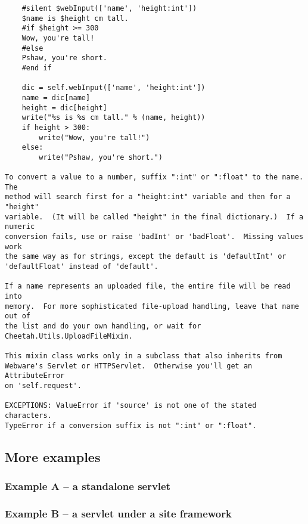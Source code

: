 \begin{verbatim}
    #silent $webInput(['name', 'height:int'])
    $name is $height cm tall.
    #if $height >= 300
    Wow, you're tall!
    #else
    Pshaw, you're short.
    #end if

    dic = self.webInput(['name', 'height:int'])
    name = dic[name]
    height = dic[height]
    write("%s is %s cm tall." % (name, height))
    if height > 300:
        write("Wow, you're tall!")
    else:
        write("Pshaw, you're short.")

To convert a value to a number, suffix ":int" or ":float" to the name.  The
method will search first for a "height:int" variable and then for a "height"
variable.  (It will be called "height" in the final dictionary.)  If a numeric
conversion fails, use or raise 'badInt' or 'badFloat'.  Missing values work
the same way as for strings, except the default is 'defaultInt' or
'defaultFloat' instead of 'default'.

If a name represents an uploaded file, the entire file will be read into 
memory.  For more sophisticated file-upload handling, leave that name out of
the list and do your own handling, or wait for Cheetah.Utils.UploadFileMixin.

This mixin class works only in a subclass that also inherits from 
Webware's Servlet or HTTPServlet.  Otherwise you'll get an AttributeError
on 'self.request'.

EXCEPTIONS: ValueError if 'source' is not one of the stated characters.
TypeError if a conversion suffix is not ":int" or ":float".
\end{verbatim}

\subsection{More examples}
\label{webware.examples}

\subsubsection*{Example A -- a standalone servlet}


\subsubsection*{Example B -- a servlet under a site framework}

